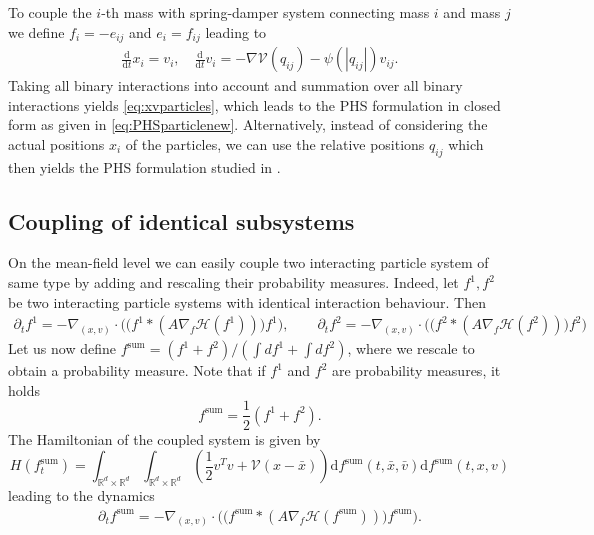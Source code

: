 \documentclass[11pt]{article}
\newcommand{\R}[0]{\mathbb R}
\newcommand{\calH}[0]{\mathcal H}
\newcommand{\calV}[0]{\mathcal V}
\newcommand{\dd}[0]{\mathrm d}
\newcommand{\V}[0]{\mathcal V}
\begin{document}
\begin{bibunit}[abbrv]
To couple the $i$-th mass with spring-damper system connecting mass $i$ and mass $j$ we define
$f_i=-e_{ij}$ and $e_i=f_{ij}$ leading to 
\begin{align*}
\frac{\dd}{\dd t} x_i = v_i, \quad \frac{\dd}{\dd t} v_i = -\nabla \calV(q_{ij})-\psi(|q_{ij}|)v_{ij}.
\end{align*}
Taking all binary interactions into account and summation over all binary interactions yields \eqref{eq:xvparticles}, which leads to the PHS formulation in closed  form as given in \eqref{eq:PHSparticlenew}.
Alternatively, instead of considering the actual positions $x_i$ of the particles, we can use the relative positions $q_{ij}$ which then yields the PHS formulation studied in 
\cite{Matei}. 


\subsection{Coupling of identical subsystems}
On the mean-field level we can easily couple two interacting particle system of same type by adding and rescaling their probability measures. Indeed, let $f^1, f^2$ be two interacting particle systems with identical interaction behaviour. Then 
\begin{align*}
    \partial_t f^1 = - \nabla_{(x,v)} \cdot \Big( \big(f^1\ast (A \nabla_f \calH(f^1)) \big) f^1 \Big), \qquad \partial_t f^2 = - \nabla_{(x,v)} \cdot \Big( \big(f^2\ast (A \nabla_f \calH(f^2)) \big) f^2 \Big)
\end{align*}
Let us now define $f^\mathrm{sum} = (f^1 + f^2)/(\int df^1 + \int df^2)$, where we rescale to obtain a probability measure. Note that if $f^1$ and $f^2$ are probability measures, it holds
\[
f^\mathrm{sum} = \frac12(f^1 + f^2).
\]
The Hamiltonian of the coupled system is given by
\[
H(f_t^\mathrm{sum}) = \int_{\mathbb R^d\times \mathbb R^d}\int_{\R^d \times \R^d} \left(  \frac{1}{2}  v^T v + \V(x-\bar x)\right) \dd f^\mathrm{sum}(t,\bar x,\bar v) \dd f^\mathrm{sum}(t,x,v)
\]
leading to the dynamics
\begin{align*}
    \partial_t f^\mathrm{sum} = - \nabla_{(x,v)} \cdot \Big( \big(f^\mathrm{sum} \ast (A \nabla_f \calH(f^\mathrm{sum})) \big) f^\mathrm{sum} \Big).
\end{align*}


\end{bibunit}
\end{document}
